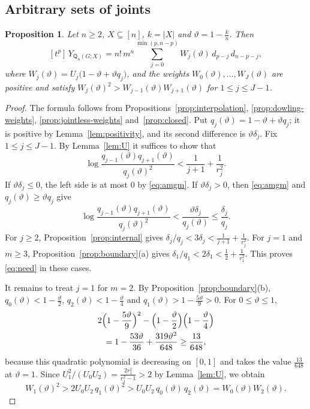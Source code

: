 \documentclass[11pt]{amsart}
\newtheorem{proposition}[theorem]{Proposition}
\theoremstyle{definition}
\theoremstyle{remark}
\numberwithin{equation}{section}
\newcommand{\Q}{\mathsf{Q}}
\begin{document}
\subsection{Arbitrary sets of joints}

\begin{proposition}\label{prop:nontrivial-weights}
Let $n\ge2$, $X\subseteq[n]$, $k=|X|$ and $\vartheta=1-\frac kn$. Then
\[
[t^p]\,Y_{\Q_n(G;X)}=n!\,m^n\sum_{j=0}^{\min(p,n-p)}W_j(\vartheta)\,d_{p-j}\,d_{n-p-j},
\]
where $W_j(\vartheta)=U_j\bigl(1-\vartheta+\vartheta q_j\bigr)$, and the weights $W_0(\vartheta),\dots,W_J(\vartheta)$ are positive and satisfy $W_j(\vartheta)^2>W_{j-1}(\vartheta)W_{j+1}(\vartheta)$ for $1\le j\le J-1$.
\end{proposition}

\begin{proof}
The formula follows from Propositions~\ref{prop:interpolation}, \ref{prop:dowling-weights}, \ref{prop:jointless-weights} and~\ref{prop:closed}. Put $q_j(\vartheta)=1-\vartheta+\vartheta q_j$; it is positive by Lemma~\ref{lem:positivity}, and its second difference is $\vartheta\delta_j$. Fix $1\le j\le J-1$. By Lemma~\ref{lem:U} it suffices to show that
\begin{equation}\label{eq:need}
\log\frac{q_{j-1}(\vartheta)q_{j+1}(\vartheta)}{q_j(\vartheta)^2}<\frac1{j+1}+\frac1{r_j^2}.
\end{equation}
If $\vartheta\delta_j\le0$, the left side is at most $0$ by \eqref{eq:amgm}. If $\vartheta\delta_j>0$, then \eqref{eq:amgm} and $q_j(\vartheta)\ge\vartheta q_j$ give
\[
\log\frac{q_{j-1}(\vartheta)q_{j+1}(\vartheta)}{q_j(\vartheta)^2}<\frac{\vartheta\delta_j}{q_j(\vartheta)}\le\frac{\delta_j}{q_j}.
\]
For $j\ge2$, Proposition~\ref{prop:internal} gives $\delta_j/q_j<3\delta_j<\frac1{j+1}+\frac1{r_j^2}$. For $j=1$ and $m\ge3$, Proposition~\ref{prop:boundary}(a) gives $\delta_1/q_1<2\delta_1<\frac12+\frac1{r_1^2}$. This proves \eqref{eq:need} in these cases.

It remains to treat $j=1$ for $m=2$. By Proposition~\ref{prop:boundary}(b), $q_0(\vartheta)<1-\frac\vartheta2$, $q_2(\vartheta)<1-\frac\vartheta4$ and $q_1(\vartheta)>1-\frac{5\vartheta}9>0$. For $0\le\vartheta\le1$,
\begin{multline*}
2\Bigl(1-\frac{5\vartheta}9\Bigr)^2-\Bigl(1-\frac\vartheta2\Bigr)\Bigl(1-\frac\vartheta4\Bigr)\\
=1-\frac{53\vartheta}{36}+\frac{319\vartheta^2}{648}\ge\frac{13}{648},
\end{multline*}
because this quadratic polynomial is decreasing on $[0,1]$ and takes the value $\frac{13}{648}$ at $\vartheta=1$. Since $U_1^2/(U_0U_2)=\frac{2r_1^2}{r_1^2-1}>2$ by Lemma~\ref{lem:U}, we obtain
\[
W_1(\vartheta)^2>2U_0U_2\,q_1(\vartheta)^2>U_0U_2\,q_0(\vartheta)\,q_2(\vartheta)=W_0(\vartheta)W_2(\vartheta).
\]
\end{proof}
\end{document}
